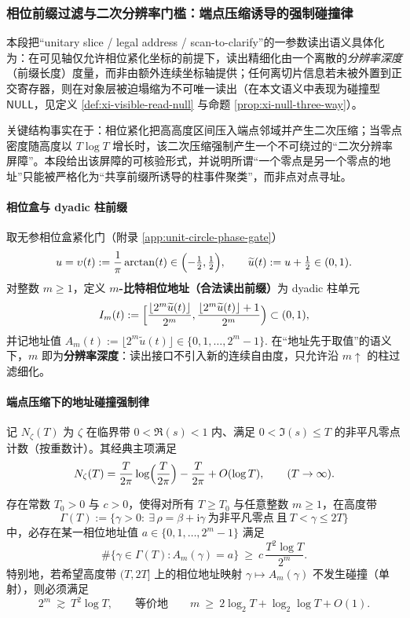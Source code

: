\subsubsection{相位前缀过滤与二次分辨率门槛：端点压缩诱导的强制碰撞律}\label{subsubsec:xi-phase-prefix-resolution-law}
本段把“unitary slice / legal address / scan-to-clarify”的一参数读出语义具体化为：在可见轴仅允许相位紧化坐标的前提下，读出精细化由一个离散的\emph{分辨率深度}（前缀长度）度量，而非由额外连续坐标轴提供；任何离切片信息若未被外置到正交寄存器，则在对象层被迫塌缩为不可唯一读出（在本文语义中表现为碰撞型 \(\mathsf{NULL}\)，见定义 \ref{def:xi-visible-read-null} 与命题 \ref{prop:xi-null-three-way}）。
\par
关键结构事实在于：相位紧化把高高度区间压入端点邻域并产生二次压缩；当零点密度随高度以 \(T\log T\) 增长时，该二次压缩强制产生一个不可绕过的“二次分辨率屏障”。本段给出该屏障的可核验形式，并说明所谓“一个零点是另一个零点的地址”只能被严格化为“共享前缀所诱导的柱事件聚类”，而非点对点寻址。

\paragraph{相位盒与 dyadic 柱前缀}
取无参相位盒紧化门（附录 \ref{app:unit-circle-phase-gate}）
\[
u=\upsilon(t):=\frac{1}{\pi}\arctan(t)\in\Bigl(-\tfrac12,\tfrac12\Bigr),
\qquad
\widetilde u(t):=u+\tfrac12\in(0,1).
\]
对整数 \(m\ge 1\)，定义 \textbf{\(m\)-比特相位地址（合法读出前缀）}为 dyadic 柱单元
\[
I_m(t):=\Bigl[\frac{\lfloor 2^m\widetilde u(t)\rfloor}{2^m},\frac{\lfloor 2^m\widetilde u(t)\rfloor+1}{2^m}\Bigr)\subset(0,1),
\]
并记地址值
\(
A_m(t):=\lfloor 2^m\widetilde u(t)\rfloor\in\{0,1,\dots,2^m-1\}.
\)
在“地址先于取值”的语义下，\(m\) 即为\textbf{分辨率深度}：读出接口不引入新的连续自由度，只允许沿 \(m\uparrow\) 的柱过滤细化。

\paragraph{端点压缩下的地址碰撞强制律}
记 \(N_\zeta(T)\) 为 \(\zeta\) 在临界带 \(0<\Re(s)<1\) 内、满足 \(0<\Im(s)\le T\) 的非平凡零点计数（按重数计）。其经典主项满足
\[
N_\zeta(T)=\frac{T}{2\pi}\log\Bigl(\frac{T}{2\pi}\Bigr)-\frac{T}{2\pi}+O(\log T),
\qquad(T\to\infty).
\]

\begin{theorem}\label{thm:xi-phase-prefix-collision-lower-bound}
存在常数 \(T_0>0\) 与 \(c>0\)，使得对所有 \(T\ge T_0\) 与任意整数 \(m\ge 1\)，在高度带
\[
\Gamma(T):=\{\gamma>0:\ \exists\,\rho=\beta+\mathrm{i}\gamma\ \text{为非平凡零点}\ \text{且}\ T<\gamma\le 2T\}
\]
中，必存在某一相位地址值 \(a\in\{0,1,\dots,2^m-1\}\) 满足
\[
\#\{\gamma\in\Gamma(T):A_m(\gamma)=a\}\ \ge\ c\,\frac{T^2\log T}{2^m}.
\]
特别地，若希望高度带 \((T,2T]\) 上的相位地址映射 \(\gamma\mapsto A_m(\gamma)\) 不发生碰撞（单射），则必须满足
\[
2^m\ \gtrsim\ T^2\log T,
\qquad\text{等价地}\qquad
m\ \ge\ 2\log_2 T+\log_2\log T+O(1).
\]
\end{theorem}

